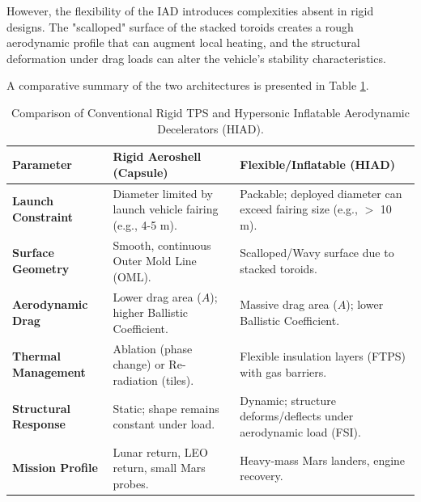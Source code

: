 However, the flexibility of the IAD introduces complexities absent in rigid designs. The "scalloped" surface of the stacked toroids creates a rough aerodynamic profile that can augment local heating, and the structural deformation under drag loads can alter the vehicle's stability characteristics.

A comparative summary of the two architectures is presented in Table \ref{tab:tps_comparison}.

\begin{table}[H]
    \centering
    \caption{Comparison of Conventional Rigid TPS and Hypersonic Inflatable Aerodynamic Decelerators (HIAD).}
    \label{tab:tps_comparison}
    \begin{tabularx}{\textwidth}{|l|X|X|}
        \hline
        \rowcolor{gray!20} \textbf{Parameter} & \textbf{Rigid Aeroshell (Capsule)} & \textbf{Flexible/Inflatable (HIAD)} \\ \hline
        \textbf{Launch Constraint} & Diameter limited by launch vehicle fairing (e.g., 4-5 m). & Packable; deployed diameter can exceed fairing size (e.g., $>$ 10 m). \\ \hline
        \textbf{Surface Geometry} & Smooth, continuous Outer Mold Line (OML). & Scalloped/Wavy surface due to stacked toroids. \\ \hline
        \textbf{Aerodynamic Drag} & Lower drag area ($A$); higher Ballistic Coefficient. & Massive drag area ($A$); lower Ballistic Coefficient. \\ \hline
        \textbf{Thermal Management} & Ablation (phase change) or Re-radiation (tiles). & Flexible insulation layers (FTPS) with gas barriers. \\ \hline
        \textbf{Structural Response} & Static; shape remains constant under load. & Dynamic; structure deforms/deflects under aerodynamic load (FSI). \\ \hline %
        \textbf{Mission Profile} & Lunar return, LEO return, small Mars probes. & Heavy-mass Mars landers, engine recovery. \\ \hline
    \end{tabularx}
\end{table}
